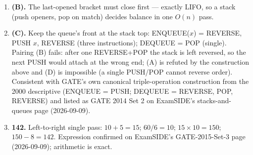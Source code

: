 \documentclass[11pt]{article}
\begin{document}
\begin{enumerate}
\item[\textbf{Q8}] \textbf{(B).} The last-opened bracket must close first --- exactly LIFO, so a stack (push openers, pop on match) decides balance in one $O(n)$ pass.

\item[\textbf{Q9}] \textbf{(C).} Keep the queue's front at the stack top: ENQUEUE($x$) = REVERSE, PUSH $x$, REVERSE (three instructions); DEQUEUE = POP (single). Pairing (B) fails: after one REVERSE+POP the stack is left reversed, so the next PUSH would attach at the wrong end; (A) is refuted by the construction above and (D) is impossible (a single PUSH/POP cannot reverse order). Consistent with GATE's own canonical triple-operation construction from the 2000 descriptive (ENQUEUE = PUSH; DEQUEUE = REVERSE, POP, REVERSE) and listed as GATE 2014 Set 2 on ExamSIDE's stacks-and-queues page (2026-09-09).

\item[\textbf{Q10}] \textbf{142.} Left-to-right single pass: $10 + 5 = 15$; $60 / 6 = 10$; $15 \times 10 = 150$; $150 - 8 = 142$. Expression confirmed on ExamSIDE's GATE-2015-Set-3 page (2026-09-09); arithmetic is exact.
\end{enumerate}
\end{document}
